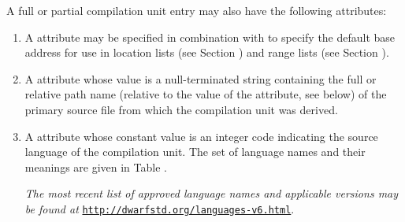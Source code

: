 A full or partial compilation unit entry
may also have the following attributes:
\begin{enumerate}[1. ]
\item 
A \DWATlowpc{} attribute may
\eb
be specified in combination with
\DWATranges{} to specify the
default base address for use in
location lists (see Section
) and range lists
(see Section ).

\item \hypertarget{chap:DWATnamepathnameofcompilationsource}{}
A \DWATnameDEFN{} attribute 
whose value is a null-terminated string
containing the full or relative path name
(relative to the value of the \DWATcompdir{} attribute,
see below) of the primary
source file from which the compilation unit was derived.

\item \hypertarget{chap:DWATlanguageprogramminglanguagename}{}
A
\bb
\DWATlanguagenameDEFN{}
\eb
attribute
whose constant value is an integer code
indicating the source language of the compilation
unit. The set of language names and their meanings are given
in Table .

\bb
\textit{The most recent list of approved language names
and applicable versions may be found at}
\texttt{\url{http://dwarfstd.org/languages-v6.html}}.
\eb


\end{enumerate}
